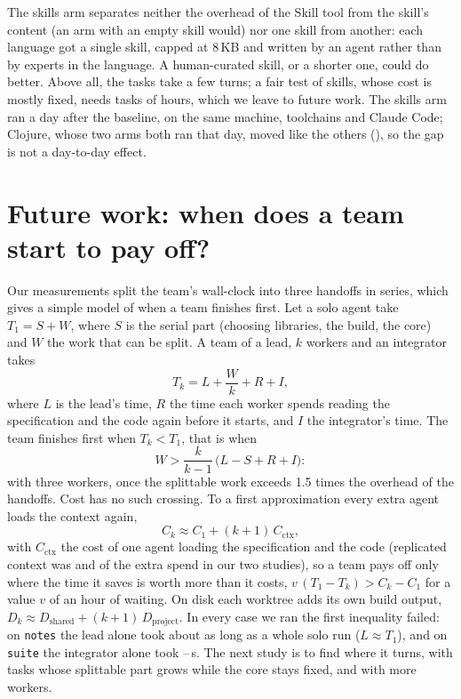 \documentclass[11pt,a4paper]{article}
\begin{document}
The skills arm separates neither the overhead of the Skill tool from the skill's content (an arm with an
empty skill would) nor one skill from another: each language got a single skill, capped at 8\,KB and
written by an agent rather than by experts in the language. A human-curated skill, or a shorter one, could
do better. Above all, the tasks take a few turns; a fair test of skills, whose cost is mostly fixed, needs
tasks of hours, which we leave to future work. The skills arm ran a day after the baseline, on the same machine, toolchains and Claude Code;
Clojure, whose two arms both ran that day, moved like the others (\SkillDeltaClojure), so the gap is not a
day-to-day effect.

\section{Future work: when does a team start to pay off?}

Our measurements split the team's wall-clock into three handoffs in series, which gives a simple model of when
a team finishes first. Let a solo agent take $T_1 = S + W$, where $S$ is the serial part (choosing libraries,
the build, the core) and $W$ the work that can be split. A team of a lead, $k$ workers and an integrator takes
\[ T_k = L + \frac{W}{k} + R + I, \]
where $L$ is the lead's time, $R$ the time each worker spends reading the specification and the code again
before it starts, and $I$ the integrator's time. The team finishes first when $T_k < T_1$, that is when
\[ W > \frac{k}{k-1}\,\bigl(L - S + R + I\bigr): \]
with three workers, once the splittable work exceeds 1.5 times the overhead of the handoffs. Cost has no such
crossing. To a first approximation every extra agent loads the context again,
\[ C_k \approx C_1 + (k+1)\,C_{\mathrm{ctx}}, \]
with $C_{\mathrm{ctx}}$ the cost of one agent loading the specification and the code (replicated context was
\SwarmShareContext{} and \NotesShareContext{} of the extra spend in our two studies), so a team pays off only
where the time it saves is worth more than it costs, $v\,(T_1 - T_k) > C_k - C_1$ for a value $v$ of an hour
of waiting. On disk each worktree adds its own build output, $D_k \approx D_{\mathrm{shared}} + (k+1)\,
D_{\mathrm{project}}$. In every case we ran the first inequality failed: on \texttt{notes} the lead alone took
about as long as a whole solo run ($L \approx T_1$), and on \texttt{suite} the integrator alone took
\SwarmIntegrateMin--\SwarmIntegrateMax\,s. The next study is to find where it turns, with tasks whose
splittable part grows while the core stays fixed, and with more workers.
\end{document}
